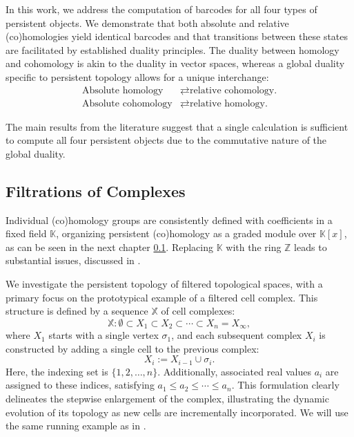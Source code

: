 In this work, we address the computation of barcodes for all four types of persistent objects. We demonstrate that both absolute and relative (co)homologies yield identical barcodes and that transitions between these states are facilitated by established duality principles. The duality between homology and cohomology is akin to the duality in vector spaces, whereas a global duality specific to persistent topology allows for a unique interchange:
\begin{align*}
	\text{Absolute homology} &\rightleftarrows \text{relative cohomology.} \\
	\text{Absolute cohomology} &\rightleftarrows \text{relative homology.}
\end{align*}

The main results from the literature suggest that a single calculation is sufficient to compute all four persistent objects due to the commutative nature of the global duality.

\subsection{Filtrations of Complexes}
Individual (co)homology groups are consistently defined with coefficients in a fixed field $\mathbb{K}$, organizing persistent (co)homology as a graded module over $\mathbb{K}[x]$, as can be seen in the next chapter \ref{}. Replacing $\mathbb{K}$ with the ring $\mathbb{Z}$ leads to substantial issues, discussed in \cite[§3.1]{zomorodian2004computing}.

We investigate the persistent topology of filtered topological spaces, with a primary focus on the prototypical example of a filtered cell complex. This structure is defined by a sequence \(\mathbb{X}\) of cell complexes:
\begin{equation*}
\mathbb{X} : \emptyset \subset X_1 \subset X_2 \subset \cdots \subset X_n = X_{\infty},
\end{equation*}
where \(X_1\) starts with a single vertex \( \sigma_1 \), and each subsequent complex \(X_i\) is constructed by adding a single cell to the previous complex:
\begin{equation*}
X_i := X_{i-1} \cup \sigma_i.
\end{equation*}
Here, the indexing set is \( \{1, 2, \ldots, n\} \). Additionally, associated real values \(a_i\) are assigned to these indices, satisfying $a_1 \leq a_2 \leq \cdots \leq a_n.$ This formulation clearly delineates the stepwise enlargement of the complex, illustrating the dynamic evolution of its topology as new cells are incrementally incorporated. We will use the same running example as in \cite[§2.2]{de2011dualities}.

